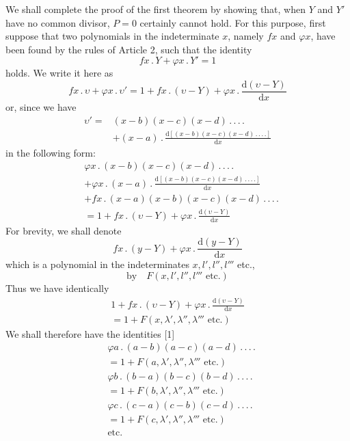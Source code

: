 We shall complete the proof of the first theorem by showing that, when $Y$ and $Y'$ have no common divisor, $P=0$ certainly cannot hold. For this purpose, first suppose that two polynomials in the indeterminate $x$, namely $fx$ and $\varphi x$, have been found by the rules of Article 2, such that the identity
\[
fx\, .\,Y+\varphi x\, .\,Y'=1
\]
holds. We write it here as
\[
fx\, .\,\upsilon+\varphi x\, .\,\upsilon'=1+fx\, .\,(\upsilon-Y)+\varphi x\, .\,\frac{\mathrm d(\upsilon-Y)}{\mathrm dx}
\]
or, since we have
\[
\begin{aligned}
\upsilon'={}&(x-b)(x-c)(x-d)\, .\, .\, .\, .\\
&+(x-a)\, .\,\frac{\mathrm d[(x-b)(x-c)(x-d)\, .\, .\, .\, .]}{\mathrm dx}
\end{aligned}
\]
in the following form:
\[
\begin{aligned}
&\varphi x\, .\,(x-b)(x-c)(x-d)\, .\, .\, .\, .\\
&+\varphi x\, .\,(x-a)\, .\,\frac{\mathrm d[(x-b)(x-c)(x-d)\, .\, .\, .\, .]}{\mathrm dx}\\
&+fx\, .\,(x-a)(x-b)(x-c)(x-d)\, .\, .\, .\, .\\&=1+fx\, .\,(\upsilon-Y)+\varphi x\, .\,\frac{\mathrm d(\upsilon-Y)}{\mathrm dx}
\end{aligned}
\]
For brevity, we shall denote
\[
fx\, .\,(y-Y)+\varphi x\, .\,\frac{\mathrm d(y-Y)}{\mathrm dx}
\]
which is a polynomial in the indeterminates $x,l',l'',l'''$ etc.,
\[
\text{by}\quad F(x,l',l'',l'''\text{ etc.})
\]
Thus we have identically
\[
\begin{gathered}1+fx\, .\,(\upsilon-Y)+\varphi x\, .\,\frac{\mathrm d(\upsilon-Y)}{\mathrm dx}\\=1+F(x,\lambda',\lambda'',\lambda'''\text{ etc.})\end{gathered}
\]
We shall therefore have the identities [1]
\[
\begin{aligned}
&\varphi a\, .\,(a-b)(a-c)(a-d)\, .\, .\, .\, .\\&=1+F(a,\lambda',\lambda'',\lambda'''\text{ etc.})\\
&\varphi b\, .\,(b-a)(b-c)(b-d)\, .\, .\, .\, .\\&=1+F(b,\lambda',\lambda'',\lambda'''\text{ etc.})\\
&\varphi c\, .\,(c-a)(c-b)(c-d)\, .\, .\, .\, .\\&=1+F(c,\lambda',\lambda'',\lambda'''\text{ etc.})\\
&\text{etc.}
\end{aligned}
\]
